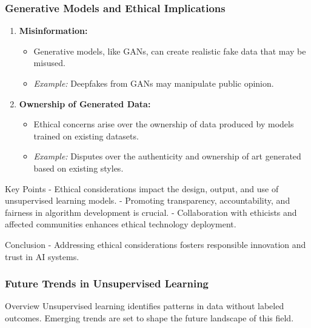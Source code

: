 \documentclass[aspectratio=169]{beamer}
\begin{document}
\begin{frame}[fragile]
  \frametitle{Generative Models and Ethical Implications}
  \begin{enumerate}
    \item \textbf{Misinformation:}
      \begin{itemize}
        \item Generative models, like GANs, can create realistic fake data that may be misused.
        \item \textit{Example:} Deepfakes from GANs may manipulate public opinion.
      \end{itemize}
    
    \item \textbf{Ownership of Generated Data:}
      \begin{itemize}
        \item Ethical concerns arise over the ownership of data produced by models trained on existing datasets.
        \item \textit{Example:} Disputes over the authenticity and ownership of art generated based on existing styles.
      \end{itemize}
  \end{enumerate}

  \begin{block}{Key Points}
      - Ethical considerations impact the design, output, and use of unsupervised learning models.
      - Promoting transparency, accountability, and fairness in algorithm development is crucial.
      - Collaboration with ethicists and affected communities enhances ethical technology deployment.
  \end{block}

  \begin{block}{Conclusion}
      - Addressing ethical considerations fosters responsible innovation and trust in AI systems.
  \end{block}
\end{frame}

\begin{frame}[fragile]
    \frametitle{Future Trends in Unsupervised Learning}
    \begin{block}{Overview}
        Unsupervised learning identifies patterns in data without labeled outcomes. Emerging trends are set to shape the future landscape of this field.
    \end{block}
\end{frame}
\end{document}
